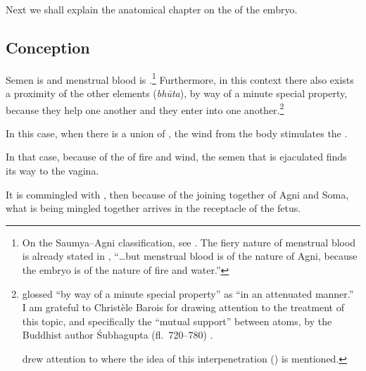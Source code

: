 \begin{translation}


\item[1] 

Next we shall explain the 
anatomical chapter on the  of the embryo. 

\subsection{Conception}
\item[3]

Semen is  and menstrual blood is
.\footnote{On the Saumya--Agni
    classification, see \cites{wuja-2004}{ange-2021}[521--527]{das-2003}.
    The fiery nature of menstrual blood is already stated in
    , “\ldots but menstrual blood is of the nature of Agni,
    because the embryo is of the nature of fire and water.”} Furthermore,
in this context there also exists a proximity of the other elements
(\emph{bhūta}), by way of a minute special
property, because they
help one another and they enter into one
another.\footnote{ glossed 
    “by way of a minute special property” as  “in an
    attenuated manner.”\label{anuna-visesena} I am grateful to Christèle
    Barois for drawing attention to the treatment of this topic, and
    specifically the  “mutual support” between atoms,
    by the Buddhist author Śubhagupta (fl.~720--780) 
    \cite[126]{sacc-2015}.
        
         drew attention
        to  where the idea of this interpenetration
        () is mentioned.}




\item [4]

In this case, when there is a union of , the
wind from the body stimulates the .

In that case, because of the  of fire and
wind, the semen that is ejaculated finds its way to the vagina.

It is commingled with , then because
of the joining together of Agni and Soma, what is being mingled together
arrives in the receptacle of the fetus. 


\end{translation}
